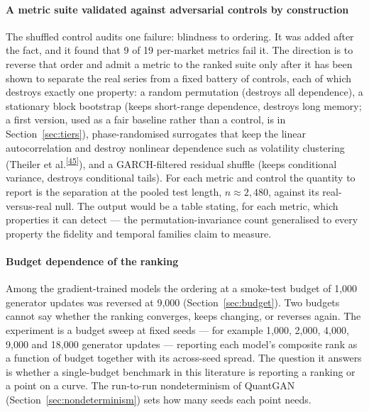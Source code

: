 \documentclass[11pt,a4paper]{article}
\makeatletter
\newcommand{\tcite}[1]{\textsuperscript{[\hyperlink{R:#1}{#1}]}}
\DeclareRobustCommand{\_}{\ifmmode\nfss@text{\textunderscore}\else\textunderscore\allowbreak\fi}
\makeatother
\begin{document}
\paragraph{A metric suite validated against adversarial controls by construction} The shuffled control audits one failure: blindness to ordering. It was added after the fact, and it found that 9 of 19 per-market metrics fail it. The direction is to reverse that order and admit a metric to the ranked suite only after it has been shown to separate the real series from a fixed battery of controls, each of which destroys exactly one property: a random permutation (destroys all dependence), a stationary block bootstrap (keeps short-range dependence, destroys long memory; a first version, used as a fair baseline rather than a control, is in Section~\ref{sec:tiers}), phase-randomised surrogates that keep the linear autocorrelation and destroy nonlinear dependence such as volatility clustering (Theiler et al.\tcite{45}), and a GARCH-filtered residual shuffle (keeps conditional variance, destroys conditional tails). For each metric and control the quantity to report is the separation at the pooled test length, $n\approx2{,}480$, against its real-versus-real null. The output would be a table stating, for each metric, which properties it can detect --- the permutation-invariance count generalised to every property the fidelity and temporal families claim to measure.

\paragraph{Budget dependence of the ranking} Among the gradient-trained models the ordering at a smoke-test budget of 1{,}000 generator updates was reversed at 9,000 (Section~\ref{sec:budget}). Two budgets cannot say whether the ranking converges, keeps changing, or reverses again. The experiment is a budget sweep at fixed seeds --- for example 1{,}000, 2{,}000, 4{,}000, 9{,}000 and 18{,}000 generator updates --- reporting each model's composite rank as a function of budget together with its across-seed spread. The question it answers is whether a single-budget benchmark in this literature is reporting a ranking or a point on a curve. The run-to-run nondeterminism of QuantGAN (Section~\ref{sec:nondeterminism}) sets how many seeds each point needs.
\end{document}
